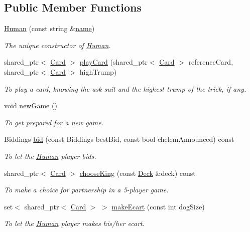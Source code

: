 \subsection*{Public Member Functions}
\begin{DoxyCompactItemize}
\item 
\hyperlink{classHuman_abfd57b90d90f9222384c76b44346ba7b}{Human} (const string \&\hyperlink{classPlayer_acf0355128a99ee20ad9931b760fb2de1}{name})
\begin{DoxyCompactList}\small\item\em The unique constructor of \hyperlink{classHuman}{Human}. \end{DoxyCompactList}\item 
shared\-\_\-ptr$<$ \hyperlink{classCard}{Card} $>$ \hyperlink{classHuman_a3258d3ce0eec7a5e393c639506ef28e5}{play\-Card} (shared\-\_\-ptr$<$ \hyperlink{classCard}{Card} $>$ reference\-Card, shared\-\_\-ptr$<$ \hyperlink{classCard}{Card} $>$ high\-Trump)
\begin{DoxyCompactList}\small\item\em To play a card, knowing the ask suit and the highest trump of the trick, if any. \end{DoxyCompactList}\item 
\hypertarget{classHuman_aae5efb6945fdbcda9c9a4d9e72d4a60e}{void \hyperlink{classHuman_aae5efb6945fdbcda9c9a4d9e72d4a60e}{new\-Game} ()}\label{classHuman_aae5efb6945fdbcda9c9a4d9e72d4a60e}

\begin{DoxyCompactList}\small\item\em To get prepared for a new game. \end{DoxyCompactList}\item 
Biddings \hyperlink{classHuman_a424bc9179b7036f22a694329b5f6fedf}{bid} (const Biddings best\-Bid, const bool chelem\-Announced) const 
\begin{DoxyCompactList}\small\item\em To let the \hyperlink{classHuman}{Human} player bids. \end{DoxyCompactList}\item 
shared\-\_\-ptr$<$ \hyperlink{classCard}{Card} $>$ \hyperlink{classHuman_a7b465bef30158c2b5552f54651e48318}{choose\-King} (const \hyperlink{classDeck}{Deck} \&deck) const 
\begin{DoxyCompactList}\small\item\em To make a choice for partnership in a 5-\/player game. \end{DoxyCompactList}\item 
set$<$ shared\-\_\-ptr$<$ \hyperlink{classCard}{Card} $>$ $>$ \hyperlink{classHuman_a02cdef89dde0adcb554f081e81f97896}{make\-Ecart} (const int dog\-Size)
\begin{DoxyCompactList}\small\item\em To let the \hyperlink{classHuman}{Human} player makes his/her ecart. \end{DoxyCompactList}\end{DoxyCompactItemize}

